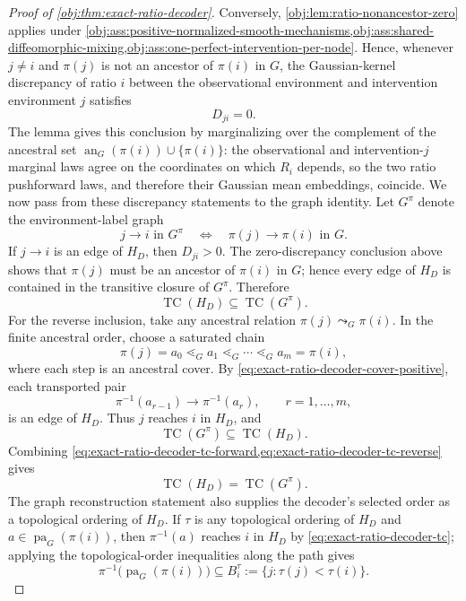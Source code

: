 \documentclass[11pt]{article}
\begin{document}
\begin{proof}[Proof of \cref{obj:thm:exact-ratio-decoder}]
Conversely, \cref{obj:lem:ratio-nonancestor-zero} applies under \cref{obj:ass:positive-normalized-smooth-mechanisms,obj:ass:shared-diffeomorphic-mixing,obj:ass:one-perfect-intervention-per-node}. Hence, whenever \(j\ne i\) and \(\pi(j)\) is not an ancestor of \(\pi(i)\) in \(G\), the Gaussian-kernel discrepancy of ratio \(i\) between the observational environment and intervention environment \(j\) satisfies
\[
D_{ji}=0.
\]
The lemma gives this conclusion by marginalizing over the complement of the ancestral set \(\operatorname{an}_G(\pi(i))\cup\{\pi(i)\}\): the observational and intervention-\(j\) marginal laws agree on the coordinates on which \(R_i\) depends, so the two ratio pushforward laws, and therefore their Gaussian mean embeddings, coincide. %
We now pass from these discrepancy statements to the graph identity. Let \(G^\pi\) denote the environment-label graph
\[
j\to i\text{ in }G^\pi
\quad\Longleftrightarrow\quad
\pi(j)\to\pi(i)\text{ in }G.
\]
If \(j\to i\) is an edge of \(H_D\), then \(D_{ji}>0\). The zero-discrepancy conclusion above shows that \(\pi(j)\) must be an ancestor of \(\pi(i)\) in \(G\); hence every edge of \(H_D\) is contained in the transitive closure of \(G^\pi\). Therefore
\begin{equation}
\operatorname{TC}(H_D)\subseteq\operatorname{TC}(G^\pi).
\label{eq:exact-ratio-decoder-tc-forward}
\end{equation}
For the reverse inclusion, take any ancestral relation \(\pi(j)\leadsto_G\pi(i)\). In the finite ancestral order, choose a saturated chain
\[
\pi(j)=a_0\lessdot_G a_1\lessdot_G\cdots\lessdot_G a_m=\pi(i),
\]
where each step is an ancestral cover. By \cref{eq:exact-ratio-decoder-cover-positive}, each transported pair
\[
\pi^{-1}(a_{r-1})\to\pi^{-1}(a_r),
\qquad r=1,\ldots,m,
\]
is an edge of \(H_D\). Thus \(j\) reaches \(i\) in \(H_D\), and
\begin{equation}
\operatorname{TC}(G^\pi)\subseteq\operatorname{TC}(H_D).
\label{eq:exact-ratio-decoder-tc-reverse}
\end{equation}
Combining \cref{eq:exact-ratio-decoder-tc-forward,eq:exact-ratio-decoder-tc-reverse} gives
\begin{equation}
\operatorname{TC}(H_D)=\operatorname{TC}(G^\pi).
\label{eq:exact-ratio-decoder-tc}
\end{equation}
The graph reconstruction statement also supplies the decoder's selected order as a topological ordering of \(H_D\). If \(\tau\) is any topological ordering of \(H_D\) and \(a\in\operatorname{pa}_G(\pi(i))\), then \(\pi^{-1}(a)\) reaches \(i\) in \(H_D\) by \cref{eq:exact-ratio-decoder-tc}; applying the topological-order inequalities along the path gives
\begin{equation}
\pi^{-1}\!\bigl(\operatorname{pa}_G(\pi(i))\bigr)
\subseteq
B_i^\tau:=\{j:\tau(j)<\tau(i)\}.
\label{eq:exact-ratio-decoder-predecessors}
\end{equation}


\end{proof}
\end{document}
